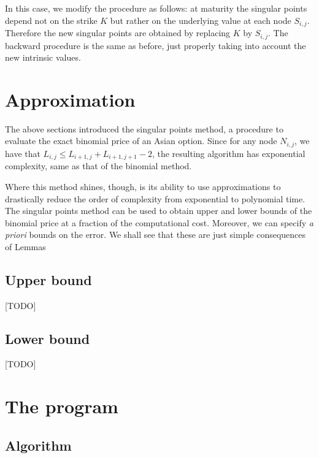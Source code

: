 \begin{rem}[Floating]
	In this case, we modify the procedure as follows: at maturity the singular points depend not on the strike $ K $ but rather on the underlying value at each node $ S_{i,j} $. Therefore the new singular points are obtained by replacing $ K $ by $ S_{i,j} $. The backward procedure is the same as before, just properly taking into account the new intrinsic values.
\end{rem}


\section{Approximation}
The above sections introduced the singular points method, a procedure to evaluate the exact binomial price of an Asian option. Since for any node $ N_{i,j} $, we have that $ L_{i,j} \le L_{i+1,j} + L_{i+1,j+1} - 2 $, the resulting algorithm has exponential complexity, same as that of the binomial method.

Where this method shines, though, is its ability to use approximations to drastically reduce the order of complexity from exponential to polynomial time. The singular points method can be used to obtain upper and lower bounds of the binomial price at a fraction of the computational cost. Moreover, we can specify \emph{a priori} bounds on the error. We shall see that these are just simple consequences of Lemmas 

\subsection{Upper bound}
\label{subsec:asian-ub}
[TODO]

\subsection{Lower bound}
\label{subsec:asian-lb}
[TODO]



\clearpage
\section{The program}
\label{sec:asian-program}

\subsection{Algorithm}

